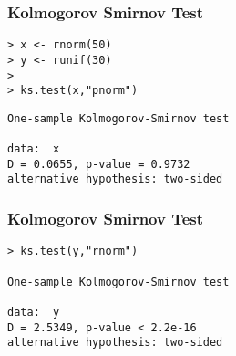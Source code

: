 \documentclass[MAIN.tex]{subfiles}
\begin{document}
 

\begin{frame}[fragile]
\frametitle{Kolmogorov Smirnov Test}

\begin{framed}
\begin{verbatim}
> x <- rnorm(50)
> y <- runif(30)
> 
> ks.test(x,"pnorm")
\end{verbatim}
\end{framed}
\begin{framed}
	\begin{verbatim}
One-sample Kolmogorov-Smirnov test

data:  x
D = 0.0655, p-value = 0.9732
alternative hypothesis: two-sided
\end{verbatim}
\end{framed}

\end{frame}
\begin{frame}[fragile]
\frametitle{Kolmogorov Smirnov Test}

\begin{framed}
\begin{verbatim}
> ks.test(y,"rnorm")

One-sample Kolmogorov-Smirnov test

data:  y
D = 2.5349, p-value < 2.2e-16
alternative hypothesis: two-sided
\end{verbatim}
\end{framed}
\end{frame}
\end{document}
